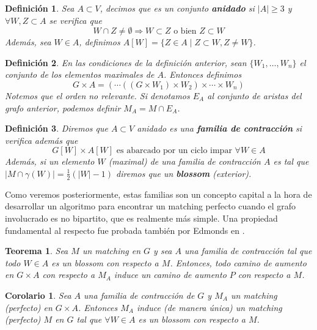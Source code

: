 \documentclass[twoside,a4paper,openright,12pt]{book}
\newtheorem{defi}{Definici\'on}[section]
\newtheorem{thm}{Teorema}[section]
\newtheorem{cor}{Corolario}[section]
\begin{document}
\begin{defi}
Sea $A\subset V$, decimos que es un conjunto \textbf{anidado} si $|A|\geq 3$ y $\forall W,Z\subset A$ se verifica que 
$$
W\cap Z \neq \emptyset \Rightarrow W\subset Z \text{ o bien } Z\subset W
$$
Además, sea $W \in A$, definimos $A[W] =\{Z\in A \mid Z\subset W, Z\neq W\}$.
\end{defi}
\begin{defi}
En las condiciones de la definición anterior, sean $\{W_1,\dotsc,W_n\}$ el conjunto de los elementos maximales de $A$. Entonces definimos
$$
G\times A = (\cdots((G\times W_1)\times W_2)\times \cdots \times W_n)
$$
Notemos que el orden no relevante. Si denotamos $E_A$ al conjunto de aristas del grafo anterior, podemos definir $M_A = M\cap E_A$. 
\end{defi}
\begin{defi}
Diremos que $A \subset V$ anidado es una \textbf{familia de contracción} si verifica además que
$$
G[W]\times A[W] \text{ es abarcado por un ciclo impar $\forall W \in A$}
$$ 
Además, si un elemento $W$ (maximal) de una familia de contracción $A$ es tal que $|M\cap\gamma(W)| = \frac{1}{2}(|W|-1)$ diremos que un \textbf{blossom} (exterior).
\end{defi}
Como veremos posteriormente, estas familias son un concepto capital a la hora de desarrollar un algoritmo para encontrar un matching perfecto cuando el grafo involucrado es no bipartito, que es realmente más simple. Una propiedad fundamental al respecto fue probada también por Edmonds en \cite{edmon2}.
\begin{thm}
Sea $M$ un matching en $G$ y sea $A$ una familia de contracción tal que todo $W\in A$ es un blossom con respecto a $M$. Entonces, todo camino de aumento en $G\times A$ con respecto a $M_A$ induce un camino de aumento $P$ con respecto a $M$.
\end{thm}
\begin{cor}
Sea $A$ una familia de contracción de $G$ y $M_A$ un matching (perfecto) en $G\times A$. Entonces $M_A$ induce (de manera única) un matching (perfecto) $M$ en $G$ tal que $\forall W\in A$ es un blossom con respecto a $M$.
\end{cor}
\end{document}

